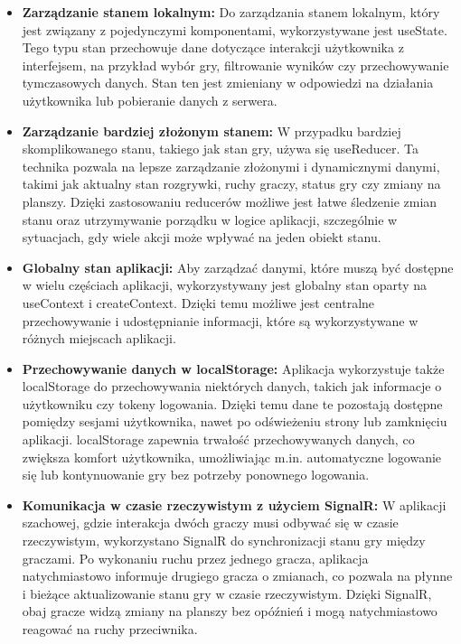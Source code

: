 \documentclass[12pt,a4paper]{article}
\begin{document}
\begin{itemize}
    \item \textbf{Zarządzanie stanem lokalnym:} Do zarządzania stanem lokalnym, który jest związany z pojedynczymi komponentami, wykorzystywane jest useState. Tego typu stan przechowuje dane dotyczące interakcji użytkownika z interfejsem, na przykład wybór gry, filtrowanie wyników czy przechowywanie tymczasowych danych. Stan ten jest zmieniany w odpowiedzi na działania użytkownika lub pobieranie danych z serwera.
    \item \textbf{Zarządzanie bardziej złożonym stanem:} W przypadku bardziej skomplikowanego stanu, takiego jak stan gry, używa się useReducer. Ta technika pozwala na lepsze zarządzanie złożonymi i dynamicznymi danymi, takimi jak aktualny stan rozgrywki, ruchy graczy, status gry czy zmiany na planszy. Dzięki zastosowaniu reducerów możliwe jest łatwe śledzenie zmian stanu oraz utrzymywanie porządku w logice aplikacji, szczególnie w sytuacjach, gdy wiele akcji może wpływać na jeden obiekt stanu.
    \item \textbf{Globalny stan aplikacji:} Aby zarządzać danymi, które muszą być dostępne w wielu częściach aplikacji, wykorzystywany jest globalny stan oparty na useContext i createContext. Dzięki temu możliwe jest centralne przechowywanie i udostępnianie informacji, które są wykorzystywane w różnych miejscach aplikacji.
    \item \textbf{Przechowywanie danych w localStorage:} Aplikacja wykorzystuje także localStorage do przechowywania niektórych danych, takich jak informacje o użytkowniku czy tokeny logowania. Dzięki temu dane te pozostają dostępne pomiędzy sesjami użytkownika, nawet po odświeżeniu strony lub zamknięciu aplikacji. localStorage zapewnia trwałość przechowywanych danych, co zwiększa komfort użytkownika, umożliwiając m.in. automatyczne logowanie się lub kontynuowanie gry bez potrzeby ponownego logowania.
    \item \textbf{Komunikacja w czasie rzeczywistym z użyciem SignalR:}
    W aplikacji szachowej, gdzie interakcja dwóch graczy musi odbywać się w czasie rzeczywistym, wykorzystano SignalR do synchronizacji stanu gry między graczami. Po wykonaniu ruchu przez jednego gracza, aplikacja natychmiastowo informuje drugiego gracza o zmianach, co pozwala na płynne i bieżące aktualizowanie stanu gry w czasie rzeczywistym. Dzięki SignalR, obaj gracze widzą zmiany na planszy bez opóźnień i mogą natychmiastowo reagować na ruchy przeciwnika.
\end{itemize}
\end{document}
